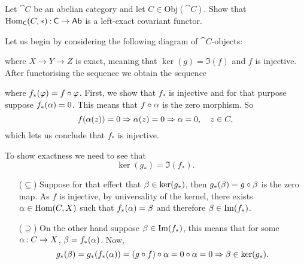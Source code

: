 \documentclass[12pt]{memoir}
\begin{document}
\begin{Ej}
    Let $\cat{C}$ be an abelian category and let $C\in\text{Obj}(\cat{C})$. Show that $\operatorname{Hom}_{\mathsf{C}}(C,\ast)\mathbin{:}\mathsf{C}\to\mathsf{Ab}$ is a left-exact covariant functor.
\end{Ej}
\begin{ptcbr}
    Let us begin by considering the following diagram of $\cat{C}$-objects:
    \begin{center}
    \end{center}
    where $X\to Y\to Z$ is exact, meaning that $\ker(g)=\Im(f)$ and $f$ is injective. After functorising the sequence we obtain the sequence 
    \begin{center}
    \end{center}
    where $f_\ast(\varphi)=f\circ\varphi$. First, we show that $f_\ast$ is injective and for that purpose suppose $f_\ast(\alpha)=0$. This means that $f\circ\alpha$ is the zero morphism. So 
    $$f(\alpha(z))=0\Rightarrow\alpha(z)=0\Rightarrow \alpha=0,\quad z\in C,$$
    which lets us conclude that $f_\ast$ is injective.\par 
    To show exactness we need to see that 
    $$\ker(g_\ast)=\Im(f_\ast).$$
    \begin{itemize}
        \itemsep=-0.4em
        \item[($\subseteq$)] Suppose for that effect that $\beta\in\ker(g_\ast)$, then $g_\ast(\beta)=g\circ\beta$ is the zero map. As $f$ is injective, by universality of the kernel, there exists $\alpha\in\operatorname{Hom}(C,X)$ such that $f_\ast(\alpha)=\beta$ and therefore $\beta\in\Im(f_\ast)$.
        \item[($\supseteq$)] On the other hand suppose $\beta\in\Im(f_\ast)$, this means that for some $\alpha\mathbin{:}C\to X$, $\beta=f_\ast(\alpha)$. Now, 
        $$g_\ast(\beta)=g_\ast(f_\ast(\alpha))=(g\circ f)\circ\alpha=0\circ\alpha=0\Rightarrow\beta\in\ker(g_\ast).$$
    \end{itemize}
\end{ptcbr}
\end{document}

